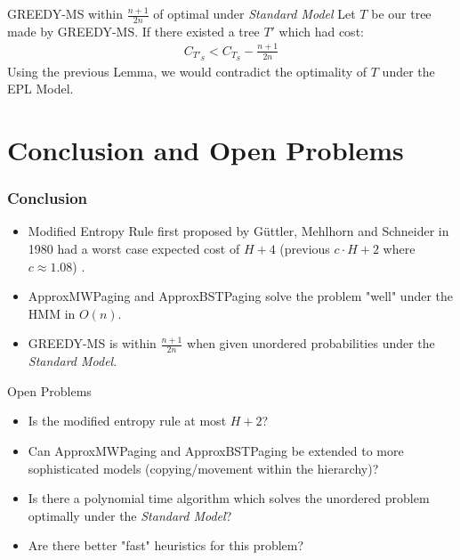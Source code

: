 \documentclass{beamer}
\theoremstyle{plain}
\begin{document}
\begin{frame}{GREEDY-MS within $\frac{n+1}{2n}$ of optimal under \textit{Standard Model}}
Let $T$ be our tree made by GREEDY-MS. If there existed a tree $T'$ which had cost:
\begin{align*}
C_{T'_S} < C_{T_S} - \frac{n+1}{2n}
\end{align*}
Using the previous Lemma, we would contradict the optimality of $T$ under the EPL Model.
\end{frame}





\section{Conclusion and Open Problems} \label{Conclusion and Open Problems}

\begin{frame} \frametitle{Conclusion}
\begin{itemize}
\item Modified Entropy Rule first proposed by  G{\"u}ttler, Mehlhorn and Schneider in 1980 had a worst case expected cost of $H+4$ (previous $c\cdot H+2$ where $c \approx 1.08$) \cite{guttler1980binary}.

\item ApproxMWPaging and ApproxBSTPaging solve the problem "well" under the HMM in $O(n)$.

\item GREEDY-MS is within $\frac{n+1}{2n}$ when given unordered probabilities under the \textit{Standard Model}.   
\end{itemize}

\end{frame}


\begin{frame}{Open Problems}
\begin{itemize}
\item Is the modified entropy rule at most $H+2$?
\item Can ApproxMWPaging and ApproxBSTPaging be extended to more sophisticated models (copying/movement within the hierarchy)?
\item Is there a polynomial time algorithm which solves the unordered problem optimally under the \textit{Standard Model}?
\item Are there better "fast" heuristics for this problem?
\end{itemize}
\end{frame}
\end{document}
